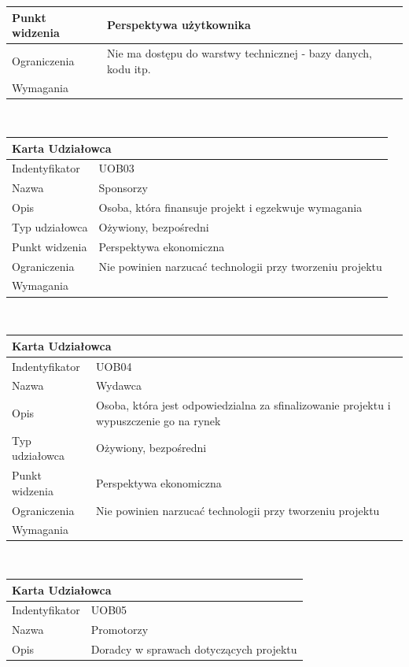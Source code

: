 \documentclass[a4paper,11pt]{report}
\begin{document}
\begin{itemize}
\begin{tabular}{|p{3cm}|p{11cm}|}
	\hline
	Punkt widzenia&Perspektywa użytkownika\\
	\hline
	Ograniczenia&Nie ma dostępu do warstwy technicznej - bazy danych, kodu itp.\\
	\hline
	Wymagania&\\
	\hline
	\end{tabular}\\
	\begin{tabular}{|p{3cm}|p{11cm}|}
	\hline
	\multicolumn{2}{|l|}{\textbf{Karta Udziałowca}}\\
	\hline
	Indentyfikator&UOB03\\
	\hline
	Nazwa&Sponsorzy\\
	\hline
	Opis&Osoba, która finansuje projekt i egzekwuje wymagania\\
	\hline
	Typ udziałowca&Ożywiony, bezpośredni\\
	\hline
	Punkt widzenia&Perspektywa ekonomiczna\\
	\hline
	Ograniczenia&Nie powinien narzucać technologii przy tworzeniu projektu\\
	\hline
	Wymagania&\\
	\hline
	\end{tabular}\\
	\begin{tabular}{|p{3cm}|p{11cm}|}
	\hline
	\multicolumn{2}{|l|}{\textbf{Karta Udziałowca}}\\
	\hline
	Indentyfikator&UOB04\\
	\hline
	Nazwa&Wydawca\\
	\hline
	Opis&Osoba, która jest odpowiedzialna za sfinalizowanie projektu i wypuszczenie go na rynek\\
	\hline
	Typ udziałowca&Ożywiony, bezpośredni\\
	\hline
	Punkt widzenia&Perspektywa ekonomiczna\\
	\hline
	Ograniczenia&Nie powinien narzucać technologii przy tworzeniu projektu\\
	\hline
	Wymagania&\\
	\hline
	\end{tabular}\\
	\begin{tabular}{|p{3cm}|p{11cm}|}
	\hline
	\multicolumn{2}{|l|}{\textbf{Karta Udziałowca}}\\
	\hline
	Indentyfikator&UOB05\\
	\hline
	Nazwa&Promotorzy\\
	\hline
	Opis&Doradcy w sprawach dotyczących projektu\\

\end{tabular}
\end{itemize}
\end{document}

